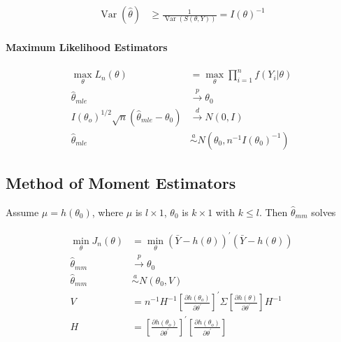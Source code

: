 \begin{align*}
    \operatorname{Var}(\hat{\theta}) &\geq \frac{1}{\operatorname{Var}(S(\theta, Y))}= I (\theta)^{-1}
\end{align*}

\paragraph{Maximum Likelihood Estimators}

\begin{align*}
    \max\limits_{\theta} L _n(\theta)&= \max\limits_{\theta} \prod_{i=1}^n f\left(Y_i | \theta\right) \\
    \widehat{\theta}_{m l e} &\stackrel{p}{\rightarrow} \theta_0 \\
    I \left(\theta_o\right)^{1 / 2} \sqrt{n}\left(\widehat{\theta}_{m l e}-\theta_0\right) &\stackrel{d}{\rightarrow} N(0, I)\\
    \widehat{\theta}_{m l e} &\stackrel{a}{\sim} N\left(\theta_0, n^{-1} I \left(\theta_0\right)^{-1}\right)
\end{align*}

\subsection{Method of Moment Estimators}

Assume $\mu = h(\theta_0)$, where $\mu$ is $l\times 1$, $\theta_0$ is $k\times 1$ with $k\leq l$. Then $\widehat{\theta}_{m m}$ solves

\begin{align*}
    \min\limits_{\theta} J_n(\theta)&=\min\limits_{\theta} (\bar{Y}-h(\theta))^{\prime}(\bar{Y}-h(\theta))\\
    \widehat{\theta}_{m m} &\stackrel{p}{\rightarrow} \theta_0 \\
    \widehat{\theta}_{m m} &\stackrel{a}{\sim} N\left(\theta_0, V\right) \\
    V &= n^{-1} H^{-1}\left[\frac{\partial h\left(\theta_o\right)}{\partial \theta^{\prime}}\right]^{\prime} \Sigma\left[\frac{\partial h(\theta)}{\partial \theta^{\prime}}\right] H^{-1} \\
    H&=\left[\frac{\partial h\left(\theta_o\right)}{\partial \theta^{\prime}}\right]^\prime \left[\frac{\partial h\left(\theta_o\right)}{\partial \theta^{\prime}}\right]
\end{align*}
